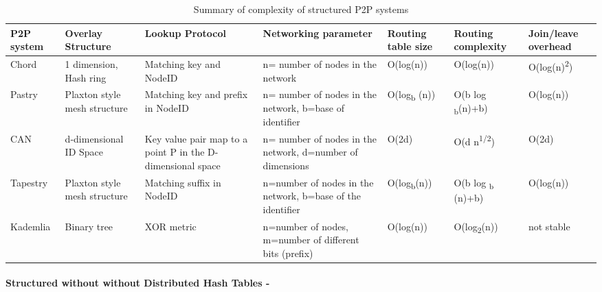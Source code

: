 \begin{table}
  \begin{tabular}{| p{1.3cm} | p{1.6cm} | p{1.9cm} | p{1.8cm} | p{1.6cm} | p{1.8cm} | p{1.8cm} |}
    \hline                        
    \textbf{P2P system} & \textbf{Overlay Structure} & \textbf{Lookup Protocol} & \textbf{Networking parameter} & \textbf{Routing table size} & \textbf{Routing complexity} & \textbf{Join/leave overhead} \\
    
    \hline
    Chord & 1 dimension, Hash ring & Matching key and NodeID & n= number of nodes in the network & O(log(n)) & O(log(n)) & O(log(n)\textsuperscript{2}) \\
    
    \hline
    Pastry & Plaxton style mesh structure & Matching key and prefix in NodeID & n= number of nodes in the network, b=base of identifier & O(log\textsubscript{b} (n)) & O(b log \textsubscript{b}(n)+b) & O(log(n)) \\
    
    \hline
    CAN & d-dimensional ID Space & Key value pair map to a point P in the D-dimensional space & n= number of nodes in the network, d=number of dimensions & O(2d) & O(d n\textsuperscript{1/2}) & O(2d) \\
    
    \hline
    Tapestry & Plaxton style mesh structure & Matching suffix in NodeID & n=number of nodes in the network, b=base of the identifier & O(log\textsubscript{b}(n)) & O(b log \textsubscript{b} (n)+b) & O(log(n)) \\
    
    \hline  
    Kademlia & Binary tree & XOR metric & n=number of nodes, m=number of different bits (prefix) & O(log(n)) & O(log\textsubscript{2}(n)) & not stable \\
    \hline      
  \end{tabular}
  \caption{Summary of complexity of structured P2P systems}
  \label{table:Complexity of structured P2P systems using a DHT}
\end{table}


\paragraph{\textbf{Structured without without Distributed Hash Tables -}} %
\label{par:Structured without Non-Distributed Hash Tables}

